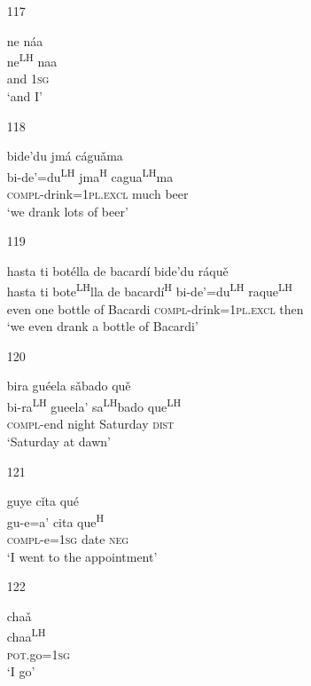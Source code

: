 \begin{itemize}
\item[117]

\glll ne n\'{a}a \\
ne\textsuperscript{LH} naa \\
and 1\textsc{sg} \\
\glt  `and I'



\item[118]

\glll bide'du jm\'{a} c\'{a}gu\v{a}ma \\
bi-de'=du\textsuperscript{LH} jma\textsuperscript{H} cagua\textsuperscript{LH}ma \\
\textsc{compl}-drink=1\textsc{pl.excl} much beer \\
\glt  `we drank lots of beer'  



\item[119]
 
\glll   hasta ti bot\'{e}lla de bacard\'{i} bide'du r\'{a}qu\v{e}\\
hasta ti bote\textsuperscript{LH}lla de bacard\'{i}\textsuperscript{H} bi-de'=du\textsuperscript{LH} raque\textsuperscript{LH}\\
even one bottle of Bacardi \textsc{compl}-drink=\textsc{1pl.excl} then\\
\glt `we even drank a bottle of Bacardi' 
 



\item[120]
 
\glll   bira gu\'{e}ela s\v{a}bado qu\v{e}  \\
 bi-ra\textsuperscript{LH} gueela' sa\textsuperscript{LH}bado que\textsuperscript{LH} \\
\textsc{compl}-end night Saturday \textsc{dist}\\
\glt `Saturday at dawn'
 


\item[121]
 
\glll   guye c\v{i}ta qu\'{e}  \\
gu-e=a' cita que\textsuperscript{H} \\
\textsc{compl}-e=\textsc{1sg} date \textsc{neg}\\
\glt `I went to the appointment'
 

\item[122]
 
\glll   cha\v{a} \\
chaa\textsuperscript{LH}\\
\textsc{pot}.go=\textsc{1sg}\\
\glt `I go'
 



\end{itemize}

